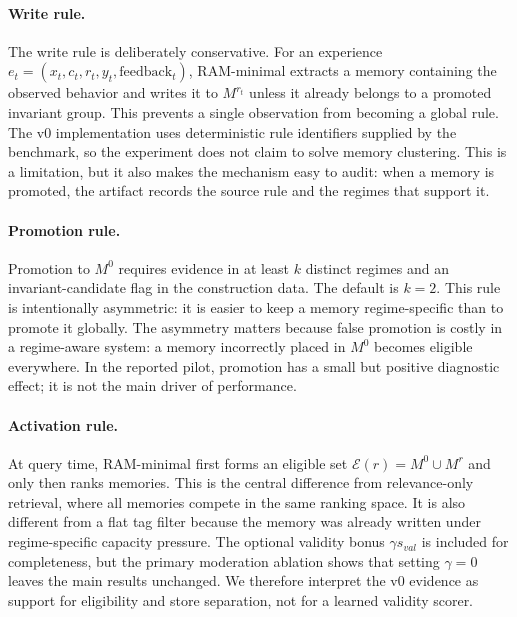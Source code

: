 \documentclass{article} %
\begin{document}
\paragraph{Write rule.}
The write rule is deliberately conservative.
For an experience $e_t=(x_t,c_t,r_t,y_t,\mathrm{feedback}_t)$, RAM-minimal extracts a memory containing the observed behavior and writes it to $M^{r_t}$ unless it already belongs to a promoted invariant group.
This prevents a single observation from becoming a global rule.
The v0 implementation uses deterministic rule identifiers supplied by the benchmark, so the experiment does not claim to solve memory clustering.
This is a limitation, but it also makes the mechanism easy to audit: when a memory is promoted, the artifact records the source rule and the regimes that support it.

\paragraph{Promotion rule.}
Promotion to $M^0$ requires evidence in at least $k$ distinct regimes and an invariant-candidate flag in the construction data.
The default is $k=2$.
This rule is intentionally asymmetric: it is easier to keep a memory regime-specific than to promote it globally.
The asymmetry matters because false promotion is costly in a regime-aware system: a memory incorrectly placed in $M^0$ becomes eligible everywhere.
In the reported pilot, promotion has a small but positive diagnostic effect; it is not the main driver of performance.

\paragraph{Activation rule.}
At query time, RAM-minimal first forms an eligible set $\mathcal{E}(r)=M^0\cup M^r$ and only then ranks memories.
This is the central difference from relevance-only retrieval, where all memories compete in the same ranking space.
It is also different from a flat tag filter because the memory was already written under regime-specific capacity pressure.
The optional validity bonus $\gamma s_{val}$ is included for completeness, but the primary moderation ablation shows that setting $\gamma=0$ leaves the main results unchanged.
We therefore interpret the v0 evidence as support for eligibility and store separation, not for a learned validity scorer.
\end{document}
